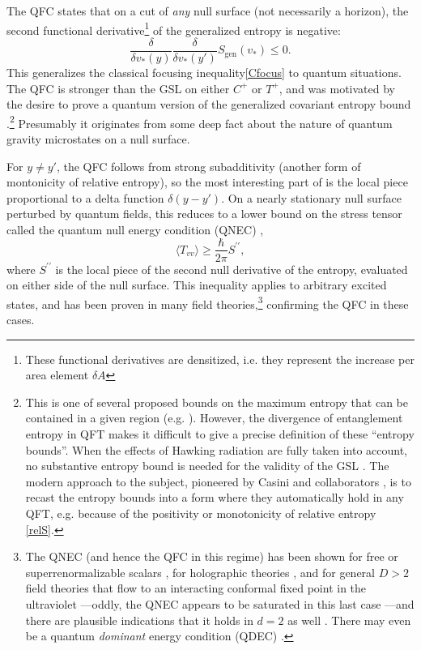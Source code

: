 \documentclass[12pt,a4paper]{article}
\def\be{\begin{equation}}
\def\ee{\end{equation}}
\begin{document}
The QFC \cite{bousso2016quantum} states that on a cut of \emph{any} null surface (not necessarily a horizon), the second functional derivative\footnote{These functional derivatives are densitized, i.e. they represent the increase per area element $\delta A$} of the generalized entropy is negative:
\be \label{eq:qfc}
\frac{\delta}{\delta v_*(y)} \frac{\delta}{\delta v_*(y')} S_\mathrm{gen}(v_*) \le 0.
\ee
This generalizes the classical focusing inequality\eqref{Cfocus} to quantum situations.  The QFC is stronger than the GSL on either $C^+$ or $T^+$, and was motivated by the desire to prove a quantum version \cite{Strominger:2003br} of the generalized covariant entropy bound \cite{GCEB}.\footnote{This is one of several proposed bounds on the maximum entropy that can be contained in a given region (e.g. \cite{bekenstein1981universal,Bousso:1999xy,GCEB}).  However, the divergence of entanglement entropy in QFT makes it difficult to give a precise definition of these ``entropy bounds''.  When the effects of Hawking radiation are fully taken into account, no substantive entropy bound is needed for the validity of the GSL \cite{unruh1982acceleration,Marolf:2003wu,Marolf:2003sq,10proofs,wall2011}.  The modern approach to the subject, pioneered by Casini and collaborators \cite{Casini:2008cr,Blanco:2013lea,GCEBq,Bousso:2014uxa}, is to recast the entropy bounds into a form where they automatically hold in any QFT, e.g. because of the positivity or monotonicity of relative entropy \eqref{relS}.}  Presumably it originates from some deep fact about the nature of quantum gravity microstates on a null surface.

For $y \ne y'$, the QFC follows from strong subadditivity (another form of montonicity of relative entropy), so the most interesting part of \label{ref:qfc} is the local piece proportional to a delta function $\delta(y - y')$.  On a nearly stationary null surface perturbed by quantum fields, this reduces to a lower bound on the stress tensor called the quantum null energy condition (QNEC) \cite{bousso2016quantum},
\be
\langle T_{vv} \rangle \ge \frac{\hbar}{2\pi}S^{\prime\prime},
\ee 
where $S^{\prime\prime}$ is the local piece of the second null derivative of the entropy, evaluated on either side of the null surface.  This inequality applies to arbitrary excited states, and has been proven in many field theories,\footnote{The QNEC (and hence the QFC in this regime) has been shown for free or superrenormalizable scalars \cite{Bousso:2015wca}, for holographic theories \cite{Koeller:2015qmn}, and for general $D > 2$ field theories that flow to an interacting conformal fixed point in the ultraviolet \cite{Balakrishnan:2017bjg}---oddly, the QNEC appears to be saturated in this last case \cite{Leichenauer:2018obf,BCFLSunpub}---and there are plausible indications that it holds in $d = 2$ as well \cite{wall2011b,Wall:2017blw}.  There may even be a quantum \emph{dominant} energy condition (QDEC) \cite{Wall:2017blw}.} confirming the QFC in these cases.
\end{document}
